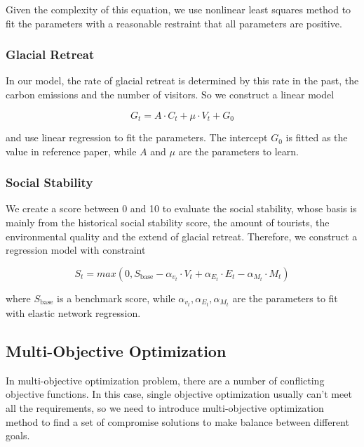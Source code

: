 \documentclass{mcmthesis}
\begin{document}
Given the complexity of this equation, we use nonlinear least squares method to fit the parameters with 
a reasonable restraint that all parameters are positive.


\subsubsection{Glacial Retreat}
In our model, the rate of glacial retreat is determined by this rate in the past, the carbon emissions and the number of visitors.
So we construct a linear model

\begin{equation}
  G_t = A \cdot C_t + \mu \cdot V_t + G_0
\end{equation}

and use linear regression to fit the parameters. The intercept $G_0$ is fitted as the value in reference paper, 
while $A$ and $\mu$ are the parameters to learn.

\subsubsection{Social Stability}
We create a score between 0 and 10 to evaluate the social stability, whose basis is mainly from 
the historical social stability score, the amount of tourists, the environmental quality and the extend of glacial retreat.
Therefore, we construct a regression model with constraint

\begin{equation}
  S_t = max\left(0, S_{\text{base}} - \alpha_{v_t} \cdot V_t + \alpha_{E_t} \cdot E_t - \alpha_{M_t} \cdot M_t\right)
\end{equation}

where $S_{\text{base}}$ is a benchmark score, while $\alpha_{v_t}, \alpha_{E_t}, \alpha_{M_t}$ are the parameters to fit 
with elastic network regression.

\subsection{Multi-Objective Optimization}
In multi-objective optimization problem, there are a number of conflicting objective functions. In this case, 
single objective optimization usually can't meet all the requirements, so we need to introduce multi-objective 
optimization method to find a set of compromise solutions to make balance between different goals.
\end{document}
